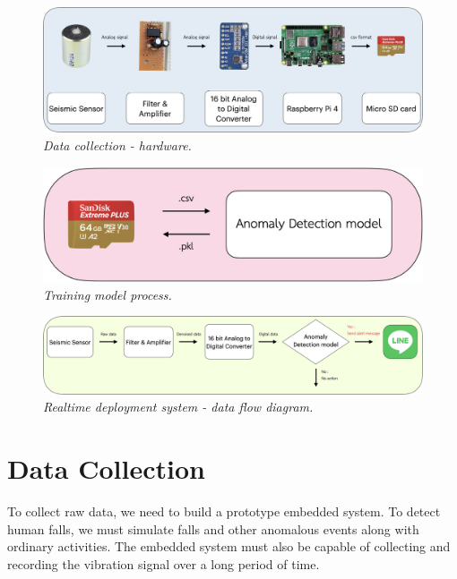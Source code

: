 \begin{figure}[H]
  \centering
  \caption[Data collection - hardware.]{\emph{Data collection - hardware.}}\label{fig:data_collection}
  \includegraphics[scale = 0.13]{figures/meth_data_collection.jpg}
\end{figure}

\begin{figure}[H]
  \centering
  \caption[Training model process.]{\emph{Training model process.}}\label{fig:training}
  \includegraphics[scale = 0.2]{figures/meth_training.jpg}
\end{figure}

\begin{figure}[H]
  \centering
  \caption[Realtime deployment system - data flow diagram.]{\emph{Realtime deployment system - data flow diagram.}}\label{fig:deploy_data_flow}
  \includegraphics[scale = 0.13]{figures/meth_deploy.jpg}
\end{figure}


\section{Data Collection}

To collect raw data, we need to build a prototype embedded system. To detect human falls, we must simulate falls and other anomalous events along with ordinary activities. The embedded system must also be capable of collecting and recording the vibration signal over a long period of time.

